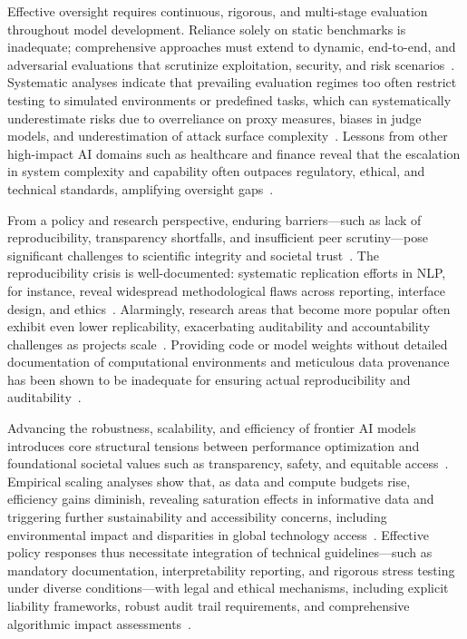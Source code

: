\documentclass[sigconf]{acmart}
\begin{document}
Effective oversight requires continuous, rigorous, and multi-stage evaluation throughout model development. Reliance solely on static benchmarks is inadequate; comprehensive approaches must extend to dynamic, end-to-end, and adversarial evaluations that scrutinize exploitation, security, and risk scenarios~\cite{ref25,ref23,ref54}. Systematic analyses indicate that prevailing evaluation regimes too often restrict testing to simulated environments or predefined tasks, which can systematically underestimate risks due to overreliance on proxy measures, biases in judge models, and underestimation of attack surface complexity~\cite{ref23,ref25,ref39,ref54}. Lessons from other high-impact AI domains such as healthcare and finance reveal that the escalation in system complexity and capability often outpaces regulatory, ethical, and technical standards, amplifying oversight gaps~\cite{ref23,ref52,ref53}.

From a policy and research perspective, enduring barriers—such as lack of reproducibility, transparency shortfalls, and insufficient peer scrutiny—pose significant challenges to scientific integrity and societal trust~\cite{ref25,ref40,ref41,ref42,ref43}. The reproducibility crisis is well-documented: systematic replication efforts in NLP, for instance, reveal widespread methodological flaws across reporting, interface design, and ethics~\cite{ref25,ref40}. Alarmingly, research areas that become more popular often exhibit even lower replicability, exacerbating auditability and accountability challenges as projects scale~\cite{ref26,ref41,ref44}. Providing code or model weights without detailed documentation of computational environments and meticulous data provenance has been shown to be inadequate for ensuring actual reproducibility and auditability~\cite{ref26,ref41,ref44}.

Advancing the robustness, scalability, and efficiency of frontier AI models introduces core structural tensions between performance optimization and foundational societal values such as transparency, safety, and equitable access~\cite{ref27,ref35,ref39,ref46}. Empirical scaling analyses show that, as data and compute budgets rise, efficiency gains diminish, revealing saturation effects in informative data and triggering further sustainability and accessibility concerns, including environmental impact and disparities in global technology access~\cite{ref27,ref39}. Effective policy responses thus necessitate integration of technical guidelines—such as mandatory documentation, interpretability reporting, and rigorous stress testing under diverse conditions—with legal and ethical mechanisms, including explicit liability frameworks, robust audit trail requirements, and comprehensive algorithmic impact assessments~\cite{ref23,ref46,ref52,ref53}.
\end{document}
